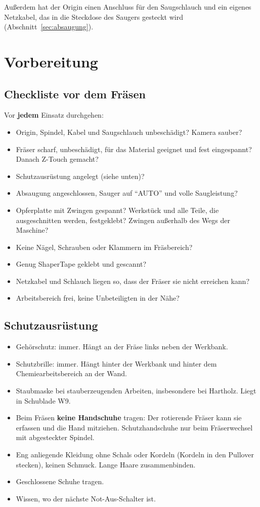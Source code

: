\documentclass{\basedir/fablab-document}
\begin{document}
	Außerdem hat der Origin einen Anschluss für den Saugschlauch und ein eigenes Netzkabel, das in die Steckdose des Saugers gesteckt wird (Abschnitt~\ref{sec:absaugung}).

	\section{Vorbereitung}

	\subsection{Checkliste vor dem Fräsen}
	Vor \textbf{jedem} Einsatz durchgehen:
	\begin{itemize}
		\item Origin, Spindel, Kabel und Saugschlauch unbeschädigt? Kamera sauber?
		\item Fräser scharf, unbeschädigt, für das Material geeignet und fest eingespannt? Danach Z-Touch gemacht?
		\item Schutzausrüstung angelegt (siehe unten)?
		\item Absaugung angeschlossen, Sauger auf \enquote{AUTO} und volle Saugleistung?
		\item Opferplatte mit Zwingen gespannt? Werkstück und alle Teile, die ausgeschnitten werden, festgeklebt? Zwingen außerhalb des Wegs der Maschine?
		\item Keine Nägel, Schrauben oder Klammern im Fräsbereich?
		\item Genug ShaperTape geklebt und gescannt?
		\item Netzkabel und Schlauch liegen so, dass der Fräser sie nicht erreichen kann?
		\item Arbeitsbereich frei, keine Unbeteiligten in der Nähe?
	\end{itemize}

	\subsection{Schutzausrüstung}
	\begin{itemize}
		\item Gehörschutz: immer. Hängt an der Fräse links neben der Werkbank.
		\item Schutzbrille: immer. Hängt hinter der Werkbank und hinter dem Chemiearbeitsbereich an der Wand.
		\item Staubmaske bei stauberzeugenden Arbeiten, insbesondere bei Hartholz. Liegt in Schublade W9.
		\item Beim Fräsen \textbf{keine Handschuhe} tragen: Der rotierende Fräser kann sie erfassen und die Hand mitziehen. Schutzhandschuhe nur beim Fräserwechsel mit abgesteckter Spindel.
		\item Eng anliegende Kleidung ohne Schals oder Kordeln (Kordeln in den Pullover stecken), keinen Schmuck. Lange Haare zusammenbinden.
		\item Geschlossene Schuhe tragen.
		\item Wissen, wo der nächste Not-Aus-Schalter ist.
	\end{itemize}
\end{document}
